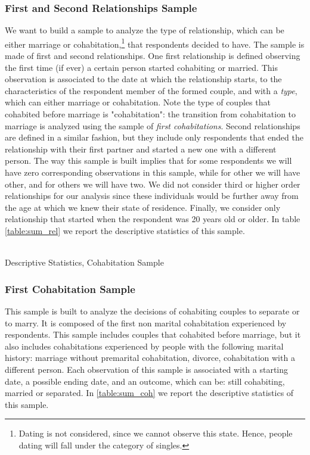 \documentclass[12pt]{article}
\numberwithin{table}{section}
\begin{document}
\subsubsection*{First and Second Relationships Sample}
We want to build a sample to analyze the type of relationship, which can be either marriage or cohabitation,\footnote{Dating is not considered, since we cannot observe this state. Hence, people dating will fall under the category of singles.} that respondents decided to have. The sample is made of first and second relationships. One first relationship is defined observing the first time (if ever) a certain person started cohabiting or married. This observation is associated to the date at which the relationship starts, to the characteristics of the respondent member of the formed couple, and with a \textit{type}, which can either marriage or cohabitation. Note the type of couples that cohabited before marriage is "cohabitation": the transition from cohabitation to marriage is analyzed using the sample of \textit{first cohabitations}. Second relationships  are defined in a similar fashion, but they include only respondents that ended the relationship with their first partner and started a new one with a different person. The way this sample is built implies that for some respondents we will have zero corresponding observations in this sample, while for other we will have other, and for others we will have two. We did not consider third or higher order relationships for our analysis since these individuals would be further away from the age at which we knew their state of residence. Finally, we consider only relationship that started when the respondent was 20 years old or older. In table \ref{table:sum_rel} we report the descriptive statistics of this sample.

\begin{table}[!htbp]\centering
	\caption{\\Descriptive Statistics, Cohabitation Sample}
	\label{table:sum_rel}

\end{table}
\FloatBarrier
\subsubsection*{First Cohabitation Sample}
This sample is built to analyze the decisions of cohabiting couples to separate or to marry. It is composed of the first non marital cohabitation experienced by respondents. This sample includes couples that cohabited before marriage, but it also includes cohabitations experienced by people with the following marital history: marriage without premarital cohabitation, divorce, cohabitation with a different person. Each observation of this sample is associated with a starting date, a possible ending date, and an outcome, which can be: still cohabiting, married or separated. In \ref{table:sum_coh} we report the descriptive statistics of this sample.
\end{document}
